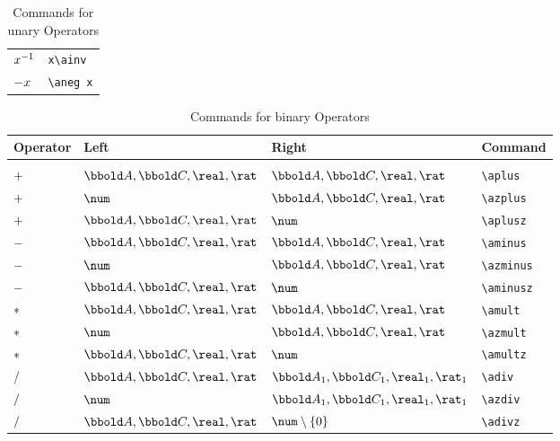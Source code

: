 \documentclass[12pt]{article}
\begin{document}
%
\begin{table}[htbp]
  \centering
  \begin{tabular}{ll}
    $x^{-1}$    & \verb|x\ainv| \\
    $- x$    & \verb|\aneg x| \\
  \end{tabular}
  \caption{Commands for unary Operators}
  \label{tab:latex-unary-operators}
\end{table}
%
\begin{table}[htbp]
  \centering
  \begin{tabular}{llll}
    Operator & Left & Right & Command \\
    \hline \\
    $+$ & $\arithmos, \complex, \real, \rat$ & $\arithmos,
                                                    \complex, \real, \rat$ & \verb|\aplus| \\
    $+$ & $\num$ & $\arithmos, \complex, \real, \rat$ & \verb|\azplus| \\
    $+$ & $\arithmos, \complex, \real, \rat$ & $\num$ & \verb|\aplusz| \\
    $-$ & $\arithmos, \complex, \real, \rat$ & $\arithmos, \complex, \real, \rat$ & \verb|\aminus| \\
    $-$ & $\num$ & $\arithmos, \complex, \real, \rat$ & \verb|\azminus| \\
    $-$ & $\arithmos, \complex, \real, \rat$ & $\num$ & \verb|\aminusz| \\
    $*$ & $\arithmos, \complex, \real, \rat$ & $\arithmos, \complex, \real, \rat$ & \verb|\amult| \\
    $*$ & $\num$ & $\arithmos, \complex, \real, \rat$ & \verb|\azmult| \\
    $*$ & $\arithmos, \complex, \real, \rat$ & $\num$ & \verb|\amultz| \\
    $/$ & $\arithmos, \complex, \real, \rat$ & $\arithmos_1, \complex_1, \real_1, \rat_1$ & \verb|\adiv| \\
    $/$ & $\num$ & $\arithmos_1, \complex_1, \real_1, \rat_1$ & \verb|\azdiv| \\
    $/$ & $\arithmos, \complex, \real, \rat$ & $\num \setminus \{0\}$ & \verb|\adivz| \\
    \hline
  \end{tabular}
  \caption{Commands for binary Operators}
  \label{tab:latex-binary-operators}
\end{table}
%
\end{document}
